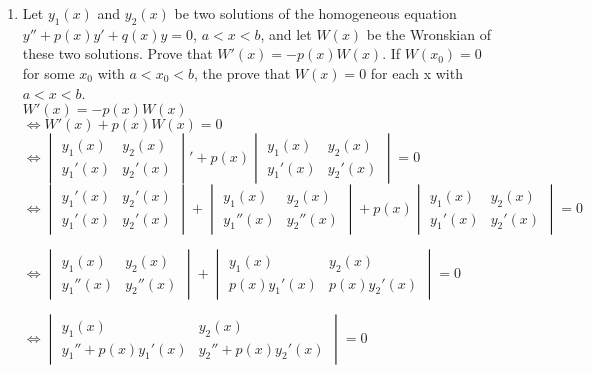 \documentclass[a4paper]{article}
\begin{document}
\begin{enumerate}
	\item Let $y_1(x)$ and $y_2(x)$ be two solutions of the homogeneous equation $y''+p(x)y'+q(x)y=0$, $a<x<b$, and let $W(x)$ be the Wronskian of these two solutions. Prove that $W'(x)=-p(x)W(x)$. If $W(x_0)=0$ for some $x_0$ with $a<x_0<b$, the prove that $W(x)=0$ for each x with $a<x<b$.\\
	$W'(x)=-p(x)W(x)$\\
	$\iff W'(x)+p(x)W(x)=0$\\
	
	$\iff \begin{vmatrix}
	y_1(x) & y_2(x)\\
	y_1'(x) & y_2'(x)
	\end{vmatrix}' + p(x)
	\begin{vmatrix}
	y_1(x) & y_2(x)\\
	y_1'(x) & y_2'(x)
	\end{vmatrix}
	=0$\\
	
	$\iff \begin{vmatrix}
	y_1'(x) & y_2'(x)\\
	y_1'(x) & y_2'(x)
	\end{vmatrix} + \begin{vmatrix}
	y_1(x) & y_2(x)\\
	y_1''(x) & y_2''(x)
	\end{vmatrix} + p(x)
	\begin{vmatrix}
	y_1(x) & y_2(x)\\
	y_1'(x) & y_2'(x)
	\end{vmatrix}
	=0$
	
	$\iff \begin{vmatrix}
	y_1(x) & y_2(x)\\
	y_1''(x) & y_2''(x)
	\end{vmatrix} +
	\begin{vmatrix}
	y_1(x) & y_2(x)\\
	p(x)y_1'(x) & p(x)y_2'(x)
	\end{vmatrix}
	=0$
	
	$\iff 
	\begin{vmatrix}
	y_1(x) & y_2(x)\\
	y_1''+ p(x)y_1'(x) & y_2''+p(x)y_2'(x)
	\end{vmatrix}
	=0$
	

\end{enumerate}
\end{document}

